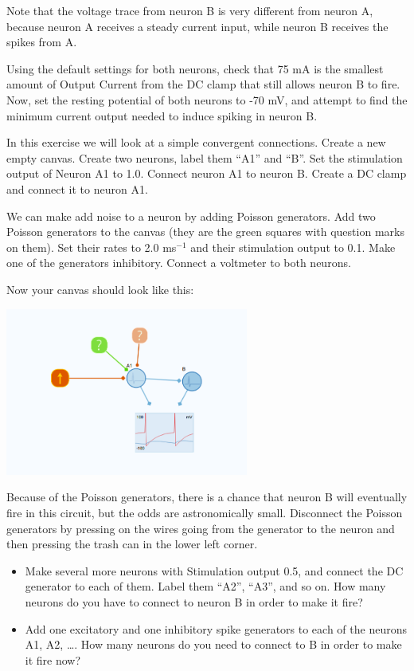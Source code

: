 \begin{Exercise}[title=Small Networks]
\begin{ExePart}
Note that the voltage trace from neuron B is very different from neuron A, because neuron A receives a steady current input, while neuron B receives the spikes from A. 

Using the default settings for both neurons, check that 75 mA is the smallest amount of Output Current from the DC clamp that still allows neuron B to fire. Now, set the resting potential of both neurons to -70 mV, and attempt to find the minimum current output needed to induce spiking in neuron B.
\end{ExePart}

\begin{ExePart}
In this exercise we will look at a simple convergent connections. Create a new empty canvas. Create two neurons, label them ``A1'' and ``B''. Set the stimulation output of Neuron A1 to 1.0. Connect neuron A1 to neuron B. Create a DC clamp and connect it to neuron A1. 

We can make add noise to a neuron by adding Poisson generators. Add two Poisson generators to the canvas (they are the green squares with question marks on them). Set their rates to 2.0 ms$^{-1}$ and their stimulation output to 0.1. Make one of the generators inhibitory. Connect a voltmeter to both neurons. 

Now your canvas should look like this: 
\begin{center}
\includegraphics[width=8cm]{two_neurons_noise.png}
\end{center}

Because of the Poisson generators, there is a chance that neuron B will eventually fire in this circuit, but the odds are astronomically small. Disconnect the Poisson generators by pressing on the wires going from the generator to the neuron and then pressing the trash can in the lower left corner. 
\begin{itemize}
\item Make several more neurons with Stimulation output 0.5, and connect the DC generator to each of them. Label them ``A2'', ``A3'', and so on. How many neurons do you have to connect to neuron B in order to make it fire? 

\item Add one excitatory and one inhibitory spike generators to each of the neurons A1, A2, \dots. How many neurons do you need to connect to B in order to make it fire now?
\end{itemize}
\end{ExePart}



\end{Exercise}
